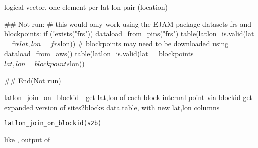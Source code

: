 \documentclass[a4paper]{book}
\begin{document}
%
\begin{Value}
logical vector, one element per lat lon pair (location)
\end{Value}
%
\begin{SeeAlso}\relax
{}   
   
\end{SeeAlso}
%
\begin{Examples}
\begin{ExampleCode}
 ## Not run: 
 # this would only work using the EJAM package datasets frs and blockpoints:
   if (!exists("frs")) dataload_from_pins("frs")
 table(latlon_is.valid(lat =  frs$lat, lon =  frs$lon))
 # blockpoints may need to be downloaded using dataload_from_aws()
 table(latlon_is.valid(lat =  blockpoints$lat, lon =  blockpoints$lon))
  
## End(Not run)
\end{ExampleCode}
\end{Examples}
%
\begin{Description}\relax
latlon\_join\_on\_blockid - get lat,lon of each block internal point via blockid
get expanded version of sites2blocks data.table, with new lat,lon columns
\end{Description}
%
\begin{Usage}
\begin{verbatim}
latlon_join_on_blockid(s2b)
\end{verbatim}
\end{Usage}
%
\begin{Arguments}
\begin{ldescription}
\item[\code{s2b}] like , output of 
\end{ldescription}
\end{Arguments}
\end{document}
